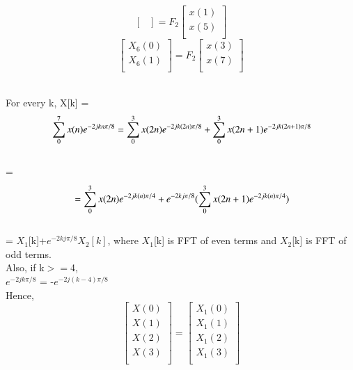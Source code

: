 \documentclass[journal,12pt,twocolumn]{IEEEtran}
\renewcommand\thesection{\arabic{section}}
\begin{document}
\begin{enumerate}[label=\arabic*.,ref=\thesection.\theenumi]
\begin{equation}
\begin{bmatrix}
\end{bmatrix}
= F_{2}
\begin{bmatrix}
x(1) \\ 
x(5) \\ 
\end{bmatrix}
\end{equation}
\begin{equation}
\begin{bmatrix}
X_{6}(0) \\ 
X_{6}(1)\\ 
\end{bmatrix}
= F_{2}
\begin{bmatrix}
x(3) \\ 
x(7) \\ 
\end{bmatrix}
\end{equation}
\begin{solution}
\\
For every k, X[k] = 
\begin{equation}
	\\
	\sum_{0}^{7}x(n)e^{-2jkn\pi/8}
	\\
	= \sum_{0}^{3}x(2n)e^{-2jk(2n)\pi/8}+\sum_{0}^{3}x(2n+1)e^{-2jk(2n+1)\pi/8}
\end{equation}
\\=
\begin{equation}
	\\
	= \sum_{0}^{3}x(2n)e^{-2jk(n)\pi/4}+e^{-2kj\pi/8}(\sum_{0}^{3}x(2n+1)e^{-2jk(n)\pi/4})
\end{equation}
\\=
$X_1$[k]+$e^{-2kj\pi/8}$$X_2[k]$, where $X_1$[k] is FFT of even terms
and $X_2$[k] is FFT of odd terms.
\\
Also, if k$>=$4,
\\
$e^{-2jk\pi/8}$ = -$e^{-2j(k-4)\pi/8}$ 
\\Hence,
\begin{equation}
\begin{bmatrix}
	X(0) \\ 
	X(1) \\
	X(2) \\
	X(3) \\
\end{bmatrix}
=
\begin{bmatrix}
	X_1(0) \\ 
	X_1(1) \\
	X_1(2) \\
	X_1(3) \\
\end{bmatrix}

\end{equation}$$
\end{solution}
\end{enumerate}
\end{document}
